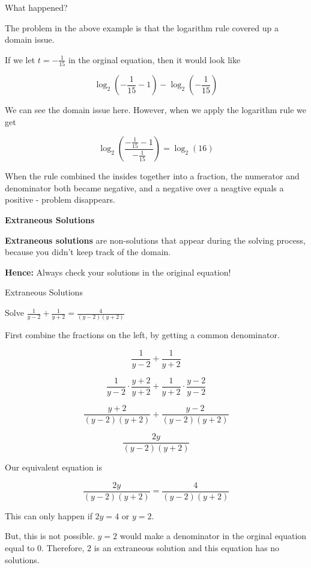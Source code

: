 \documentclass{ximera}
\begin{document}
What happened?


The problem in the above example is that the logarithm rule covered up a domain issue.

If we let $t = -\frac{1}{15}$ in the orginal equation, then it would look like 


\[    \log_2\left(-\frac{1}{15}-1\right) - \log_2\left(-\frac{1}{15}\right)   \]

We can see the domain issue here.  However, when we apply the logarithm rule we get



\[   \log_2\left(\frac{-\frac{1}{15}-1}{-\frac{1}{15}}\right)    = \log_2(16)  \]


When the rule combined the insides together into a fraction, the numerator and denominator both became negative, and a negative over a neagtive equals a positive - problem disappears.





\begin{definition}  \textbf{\textcolor{green!50!black}{Extraneous Solutions}}

\textbf{Extraneous solutions} are non-solutions that appear during the solving process, because you didn't keep track of the domain.

\end{definition}

\textbf{Hence:} Always check your solutions in the original equation!







\begin{example} Extraneous Solutions


Solve $\frac{1}{y-2} + \frac{1}{y+2} = \frac{4}{(y-2)(y+2)}$


\begin{explanation}



First combine the fractions on the left, by getting a common denominator.



\[    \frac{1}{y-2} + \frac{1}{y+2}        \]

\[    \frac{1}{y-2} \cdot \frac{y+2}{y+2} + \frac{1}{y+2}  \cdot \frac{y-2}{y-2}       \]

\[    \frac{y+2}{(y-2)(y+2)} + \frac{y-2}{(y-2)(y+2)}      \]

\[    \frac{2y}{(y-2)(y+2)}     \]

Our equivalent equation is


\[    \frac{2y}{(y-2)(y+2)}   = \frac{4}{(y-2)(y+2)}   \]


This can only happen if $2y = 4$ or $y = 2$.

But, this is not possible.  $y=2$ would make a denominator in the orginal equation equal to $0$.  Therefore, $2$ is an extraneous solution and this equation has no solutions.


\end{explanation}
\end{example}
\end{document}
